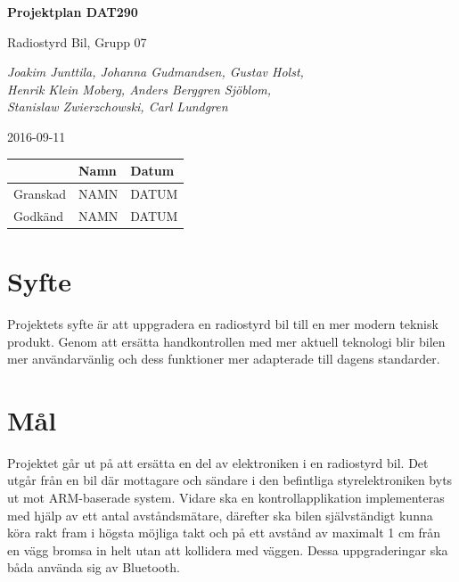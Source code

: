 \documentclass[a4paper]{article}
\begin{document}
\begin{titlepage}
\centering
{\bfseries\huge Projektplan DAT290}

\vspace{10mm}

{\Large Radiostyrd Bil, Grupp 07}

\vspace{20mm}

{\Large \itshape{Joakim Junttila, Johanna Gudmandsen, Gustav Holst,\\Henrik Klein Moberg, Anders Berggren Sjöblom, \\[1mm] Stanislaw Zwierzchowski, Carl Lundgren}}

\vspace{10mm}

{\large 2016-09-11}


\normalsize{
\begin{table}[b]
\centering
\begin{tabular}{|l|l|l|}  \hline
          & \bf Namn & \bf Datum   \\ \hline \hline
 Granskad & NAMN     & DATUM        \\ \hline
 Godkänd  & NAMN     & DATUM         \\ \hline
  \end{tabular}  
  \end{table}}

\end{titlepage}
\newpage
\tableofcontents
\newpage


\section{Syfte}
Projektets syfte är att uppgradera en radiostyrd bil till en mer modern teknisk produkt. Genom att ersätta handkontrollen med mer aktuell teknologi blir bilen mer användarvänlig och dess funktioner mer adapterade till dagens standarder.

\section{Mål}
Projektet går ut på att ersätta en del av elektroniken i en radiostyrd bil. Det utgår från en bil där mottagare och sändare i den befintliga styrelektroniken byts ut mot ARM-baserade system. Vidare ska en kontrollapplikation implementeras med hjälp av ett antal avståndsmätare, därefter ska bilen självständigt kunna köra rakt fram i högsta möjliga takt och på ett avstånd av maximalt 1 cm från en vägg bromsa in helt utan att kollidera med väggen. Dessa uppgraderingar ska båda använda sig av Bluetooth. 
\end{document}
